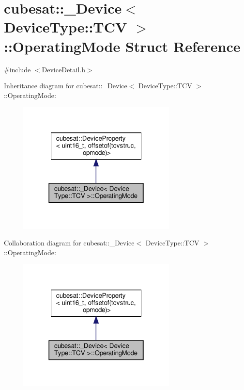 \hypertarget{structcubesat_1_1__Device_3_01DeviceType_1_1TCV_01_4_1_1OperatingMode}{}\section{cubesat\+:\+:\+\_\+\+Device$<$ Device\+Type\+:\+:T\+CV $>$\+:\+:Operating\+Mode Struct Reference}
\label{structcubesat_1_1__Device_3_01DeviceType_1_1TCV_01_4_1_1OperatingMode}


{\ttfamily \#include $<$Device\+Detail.\+h$>$}



Inheritance diagram for cubesat\+:\+:\+\_\+\+Device$<$ Device\+Type\+:\+:T\+CV $>$\+:\+:Operating\+Mode\+:\nopagebreak
\begin{figure}[H]
\begin{center}
\leavevmode
\includegraphics[width=226pt]{structcubesat_1_1__Device_3_01DeviceType_1_1TCV_01_4_1_1OperatingMode__inherit__graph}
\end{center}
\end{figure}


Collaboration diagram for cubesat\+:\+:\+\_\+\+Device$<$ Device\+Type\+:\+:T\+CV $>$\+:\+:Operating\+Mode\+:\nopagebreak
\begin{figure}[H]
\begin{center}
\leavevmode
\includegraphics[width=226pt]{structcubesat_1_1__Device_3_01DeviceType_1_1TCV_01_4_1_1OperatingMode__coll__graph}
\end{center}
\end{figure}
